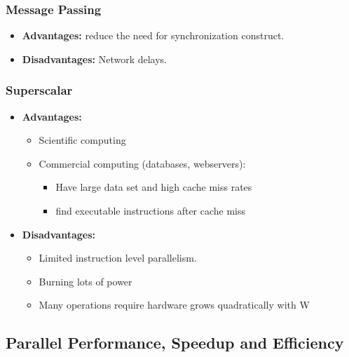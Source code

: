 \documentclass[../main.tex]{subfiles}
\begin{document}
\subsubsection{Message Passing}

\begin{itemize}
	\item \textbf{Advantages:} reduce the need for synchronization construct.
	\item \textbf{Disadvantages:} Network delays.
\end{itemize}

\subsubsection{Superscalar}

\begin{itemize}
	\item \textbf{Advantages:}
	      \begin{itemize}
		      \item Scientific computing
		      \item Commercial computing (databases, webservers):
		            \begin{itemize}
			            \item Have large data set and  high cache miss rates
			            \item find executable instructions after cache miss
		            \end{itemize}
	      \end{itemize}
	\item \textbf{Disadvantages:}
	      \begin{itemize}
		      \item Limited instruction level parallelism.
		      \item Burning lots of power
		      \item Many operations require hardware grows quadratically with W
	      \end{itemize}
\end{itemize}

\subsection{Parallel Performance, Speedup and Efficiency}
\end{document}
